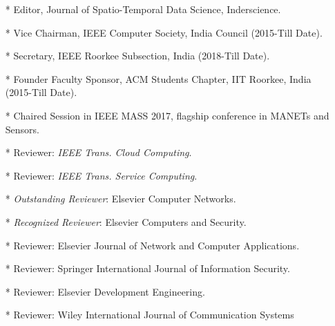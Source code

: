 \begin{itemize}
	\item[*] Editor, Journal of Spatio-Temporal Data Science, Inderscience.

	\item[*] Vice Chairman, IEEE Computer Society, India Council (2015-Till Date).

	\item[*] Secretary, IEEE Roorkee Subsection, India (2018-Till Date).

	\item[*] Founder Faculty Sponsor, ACM Students Chapter, IIT Roorkee, India (2015-Till Date).
	
	\item[*] Chaired Session in IEEE MASS 2017, flagship conference in MANETs and Sensors.
		
	\item[*] Reviewer: \textit{IEEE Trans. Cloud Computing}.
	
	\item[*] Reviewer: \textit{IEEE Trans. Service Computing}.
	
	\item[*] \textit{ Outstanding Reviewer}: Elsevier Computer Networks.

	\item[*] \textit{Recognized Reviewer}: Elsevier Computers and Security.

	\item[*] Reviewer: Elsevier Journal of Network and Computer Applications.
	
	\item[*] Reviewer: Springer International Journal of Information Security.
	
	\item[*] Reviewer: Elsevier Development Engineering. 
	
	\item[*] Reviewer: Wiley International Journal of Communication Systems

	\end{itemize}
	
